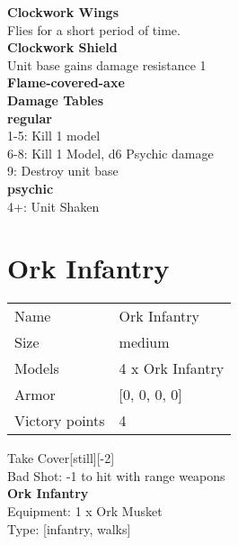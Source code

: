 {\bf Clockwork Wings } \\

Flies for a short period of time.\\ 

{\bf Clockwork Shield } \\

Unit base gains damage resistance 1\\ 

{\bf Flame-covered-axe } \\






 





{\bf Damage Tables} \\
 {\bf regular } \\
1-5: Kill 1 model \\
6-8: Kill 1 Model, d6 Psychic damage \\
9: Destroy unit base \\
 {\bf psychic } \\
4+: Unit Shaken \\










\pagebreak\pagebreak

\section{ Ork Infantry }

\begin{tabular}{ll}
  Name & Ork Infantry \\
  Size & medium\\
  Models & 4 x Ork Infantry\\
  Armor & [0, 0, 0, 0]\\
  Victory points & 4\\
\end{tabular}

Take Cover[still][-2]\\ 
Bad Shot: -1 to hit with range weapons\\ 


{\bf Ork Infantry } \\
Equipment: 1 x Ork Musket \\
Type: [infantry, walks] \\

